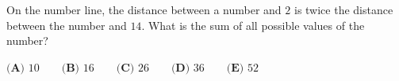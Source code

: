 On the number line, the distance between a number and $2$ is twice the distance between the number and $14$. What is the sum of all possible values of the number?

$\textbf{(A) }10\qquad\textbf{(B) }16\qquad\textbf{(C) }26\qquad\textbf{(D) }36\qquad\textbf{(E) }52$
